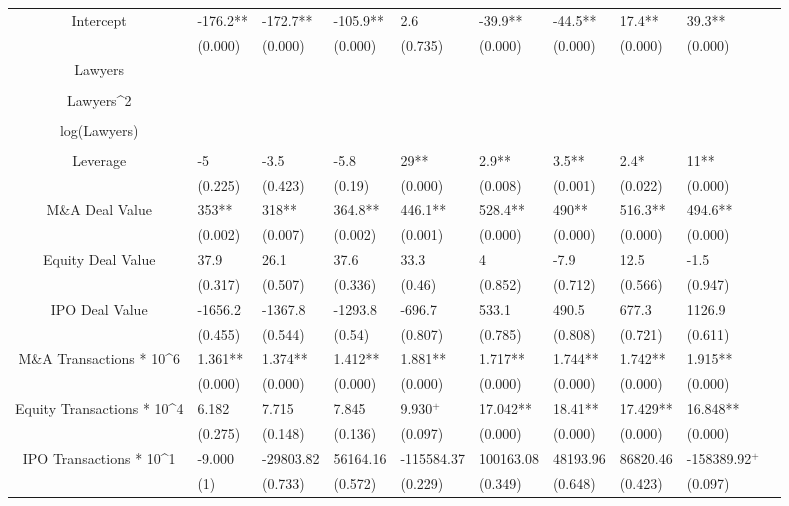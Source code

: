 \documentclass{article}
\begin{document}
\begin{table}[H]
\begin{tabular}{|clllllllll|}
Intercept & -176.2** & -172.7** & -105.9** & 2.6 & -39.9** & -44.5** & 17.4** & 39.3** & \\ 
   & (0.000) & (0.000) & (0.000) & (0.735) & (0.000) & (0.000) & (0.000) & (0.000) & \\ 
  Lawyers &  &  &  &  &  &  &  &  & \\ 
   &  &  &  &  &  &  &  &  & \\ 
  Lawyers^2 &  &  &  &  &  &  &  &  & \\ 
   &  &  &  &  &  &  &  &  & \\ 
  log(Lawyers) &  &  &  &  &  &  &  &  & \\ 
   &  &  &  &  &  &  &  &  & \\ 
  Leverage & -5 & -3.5 & -5.8 & 29** & 2.9** & 3.5** & 2.4* & 11** & \\ 
   & (0.225) & (0.423) & (0.19) & (0.000) & (0.008) & (0.001) & (0.022) & (0.000) & \\ 
  M\&A Deal Value & 353** & 318** & 364.8** & 446.1** & 528.4** & 490** & 516.3** & 494.6** & \\ 
   & (0.002) & (0.007) & (0.002) & (0.001) & (0.000) & (0.000) & (0.000) & (0.000) & \\ 
  Equity Deal Value & 37.9 & 26.1 & 37.6 & 33.3 & 4 & -7.9 & 12.5 & -1.5 & \\ 
   & (0.317) & (0.507) & (0.336) & (0.46) & (0.852) & (0.712) & (0.566) & (0.947) & \\ 
  IPO Deal Value & -1656.2 & -1367.8 & -1293.8 & -696.7 & 533.1 & 490.5 & 677.3 & 1126.9 & \\ 
   & (0.455) & (0.544) & (0.54) & (0.807) & (0.785) & (0.808) & (0.721) & (0.611) & \\ 
  M\&A Transactions * 10^6 & 1.361** & 1.374** & 1.412** & 1.881** & 1.717** & 1.744** & 1.742** & 1.915** & \\ 
   & (0.000) & (0.000) & (0.000) & (0.000) & (0.000) & (0.000) & (0.000) & (0.000) & \\ 
  Equity Transactions * 10^4 & 6.182 & 7.715 & 7.845 & 9.930$^{+}$ & 17.042** & 18.41** & 17.429** & 16.848** & \\ 
   & (0.275) & (0.148) & (0.136) & (0.097) & (0.000) & (0.000) & (0.000) & (0.000) & \\ 
  IPO Transactions * 10^1 & -9.000 & -29803.82 & 56164.16 & -115584.37 & 100163.08 & 48193.96 & 86820.46 & -158389.92$^{+}$ & \\ 
   & (1) & (0.733) & (0.572) & (0.229) & (0.349) & (0.648) & (0.423) & (0.097) & \\ 

\end{tabular}
\end{table}
\end{document}
